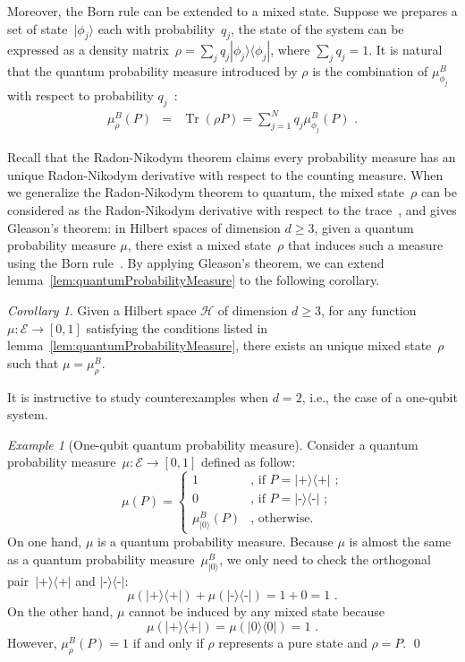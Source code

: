 \documentclass{article}
\theoremstyle{remark}
\newtheorem{example}{Example}
\newtheorem{cor}{Corollary}
\newcommand{\events}{\ensuremath{\mathcal{E}}}
\newcommand{\Hilb}{\mathcal{H}}
\newcommand{\ket}[1]{|#1\rangle}
\newcommand{\proj}[1]{|#1 \rangle\langle #1 |}
\newcommand{\ps}{\texttt{+}}
\newcommand{\ms}{\texttt{-}}
\newcommand{\Tr}{\mathop{\mathrm{Tr}}\nolimits}
\begin{document}
Moreover, the Born rule can be extended to a mixed state. Suppose
we prepares a set of state~$\ket{\phi_{j}}$ each with probability~$q_{j}$,
the state of the system can be expressed as a density matrix~$\rho=\sum_{j}q_{j}\proj{\phi_{j}}$,
where $\sum_{j}q_{j}=1$. It is natural that the quantum probability
measure introduced by $\rho$ is the combination of $\mu_{\phi_{j}}^{B}$
with respect to probability $q_{j}$~\cite{peres1995quantum,544199,RiederSvozil2007}:
\begin{eqnarray}
\mu_{\rho}^{B}\left(P\right) & = & \Tr\left(\rho P\right)=\sum_{j=1}^{N}q_{j}\mu_{\phi_{j}}^{B}\left(P\right)\textrm{ .}\label{BornRule.mixed}
\end{eqnarray}

Recall that the Radon-Nikodym theorem claims every probability measure
has an unique Radon-Nikodym derivative with respect to the counting
measure. When we generalize the Radon-Nikodym theorem to quantum,
the mixed state~$\rho$ can be considered as the Radon-Nikodym derivative
with respect to the trace~\cite{HollandJr1970,Redhead1987-REDINA,Jaeger2007},
and gives Gleason's theorem: in Hilbert spaces of dimension $d\geq3$,
given a quantum probability measure $\mu$, there exist a mixed state~$\rho$
that induces such a measure using the Born rule~\cite{gleason1957,Redhead1987-REDINA,peres1995quantum}.
By applying Gleason's theorem, we can extend lemma~\ref{lem:quantumProbabilityMeasure}
to the following corollary.

\begin{cor}\label{cor:Gleason's}Given a Hilbert space $\Hilb$ of
dimension $d\geq3$, for any function~$\mu:\events\rightarrow[0,1]$
satisfying the conditions listed in lemma~\ref{lem:quantumProbabilityMeasure},
there exists an unique mixed state~$\rho$ such that $\mu=\mu_{\rho}^{B}$.\end{cor}

It is instructive to study counterexamples when $d=2$, i.e., the
case of a one-qubit system.

\begin{example}[One-qubit quantum probability measure] Consider
a quantum probability measure~$\mu:\events\rightarrow[0,1]$ defined
as follow: 
\[
\mu(P)=\begin{cases}
1 & \textrm{, if }P=\proj{\ps}\textrm{ ;}\\
0 & \textrm{, if }P=\proj{\ms}\textrm{ ;}\\
\mu^B_{\ket{0}}(P) & \textrm{, otherwise.}
\end{cases}
\]
On one hand, $\mu$ is a quantum probability measure. Because $\mu$ is almost
the same as a quantum probability measure~$\mu^B_{\ket{0}}$, we only
need to check the orthogonal pair~$\proj{\ps}$ and $\proj{\ms}$:
\[
\mu(\proj{\ps})+\mu(\proj{\ms})=1+0=1\textrm{ .}
\]
On the other hand, $\mu$ cannot be induced by any mixed state because
\[
\mu(\proj{\ps})=\mu(\proj{0})=1\textrm{ .}
\]
However, $\mu^B_{\rho}(P)=1$ if and only if $\rho$ represents
a pure state and $\rho=P$. \qed\end{example}
\end{document}
